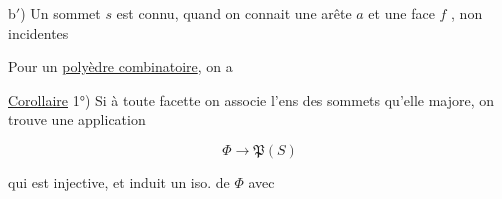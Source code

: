 b$'$) Un sommet $s$ est connu, quand on connait une arête $a$ et une face $f$ , non incidentes

Pour un \uline{polyèdre combinatoire}, on a

\uline{Corollaire} 1°) Si à toute facette on associe l'ens des sommets qu'elle majore, on trouve une application

\[
 \Phi\longrightarrow\mathfrak P(S)
\]

qui est injective, et induit un iso.  de $\Phi$ avec


